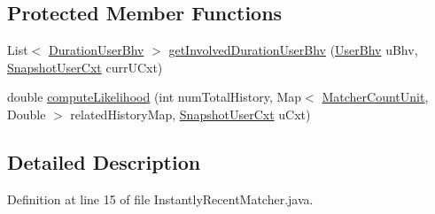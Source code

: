 \subsection*{\-Protected \-Member \-Functions}
\begin{DoxyCompactItemize}
\item 
\-List$<$ \hyperlink{classlab_1_1davidahn_1_1appshuttle_1_1collect_1_1bhv_1_1_duration_user_bhv}{\-Duration\-User\-Bhv} $>$ \hyperlink{classlab_1_1davidahn_1_1appshuttle_1_1predict_1_1matcher_1_1recent_1_1_instantly_recent_matcher_a890bacc993dd950c2c2f196de4a52493}{get\-Involved\-Duration\-User\-Bhv} (\hyperlink{interfacelab_1_1davidahn_1_1appshuttle_1_1collect_1_1bhv_1_1_user_bhv}{\-User\-Bhv} u\-Bhv, \hyperlink{classlab_1_1davidahn_1_1appshuttle_1_1collect_1_1_snapshot_user_cxt}{\-Snapshot\-User\-Cxt} curr\-U\-Cxt)
\item 
double \hyperlink{classlab_1_1davidahn_1_1appshuttle_1_1predict_1_1matcher_1_1recent_1_1_instantly_recent_matcher_a911c377e0f5aded9b110ed99d2915b86}{compute\-Likelihood} (int num\-Total\-History, \-Map$<$ \hyperlink{classlab_1_1davidahn_1_1appshuttle_1_1predict_1_1matcher_1_1_matcher_count_unit}{\-Matcher\-Count\-Unit}, \-Double $>$ related\-History\-Map, \hyperlink{classlab_1_1davidahn_1_1appshuttle_1_1collect_1_1_snapshot_user_cxt}{\-Snapshot\-User\-Cxt} u\-Cxt)
\end{DoxyCompactItemize}


\subsection{\-Detailed \-Description}


\-Definition at line 15 of file \-Instantly\-Recent\-Matcher.\-java.



